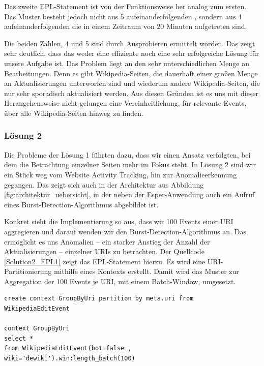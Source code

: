 Das zweite EPL-Statement ist von der Funktionsweise her analog zum ersten. Das Muster besteht jedoch nicht aus
5 aufeinanderfolgenden , sondern aus
4 aufeinanderfolgenden  die in einem Zeitraum von 20 Minuten aufgetreten sind.

Die beiden Zahlen, 4 und 5 sind durch Ausprobieren ermittelt worden. Das zeigt sehr deutlich, dass das weder eine
effiziente noch eine sehr erfolgreiche Lösung für unsere Aufgabe ist.
Das Problem liegt an den sehr unterschiedlichen Menge an Bearbeitungen.
Denn es gibt Wikipedia-Seiten, die dauerhaft einer großen Menge an Aktualisierungen unterworfen sind und wiederum andere Wikipedia-Seiten, die
nur sehr sporadisch aktualisiert werden. Aus diesen Gründen ist es uns mit dieser Herangehensweise
nicht gelungen eine Vereinheitlichung, für relevante Events, über alle Wikipedia-Seiten hinweg zu finden.

\subsubsection{Lösung 2}
Die Probleme der Lösung 1 führten dazu, dass wir einen Ansatz verfolgten, bei dem die Betrachtung einzelner Seiten mehr im Fokus steht.
In Lösung 2 sind wir ein Stück weg vom Website Activity Tracking, hin zur Anomalieerkennung gegangen. Das zeigt sich auch in der
Architektur aus Abbildung \ref{fig:architektur_uebersicht}, in der neben der Esper-Anwendung auch ein Aufruf eines
Burst-Detection-Algorithmus abgebildet ist.

Konkret sieht die Implementierung so aus, dass wir 100 Events einer URI aggregieren und darauf wenden wir den Burst-Detection-Algorithmus an.
Das ermöglicht es uns Anomalien -- ein starker Anstieg der Anzahl der Aktualisierungen -- einzelner URIs zu betrachten.
Der Quellcode \ref{Solution2_EPL1} zeigt das EPL-Statement hierzu. Es wird eine URI-Partitionierung mithilfe eines
Kontexts erstellt. Damit wird das Muster zur Aggregation der 100 Events je URI, mit einem Batch-Window, umgesetzt.

\begin{lstlisting}[label=Solution2_EPL1,caption=Lösung 2: EPL-Statement 2,language=epl,firstnumber=1,captionpos=b]
create context GroupByUri partition by meta.uri from WikipediaEditEvent

context GroupByUri
select *
from WikipediaEditEvent(bot=false , wiki='dewiki').win:length_batch(100)
\end{lstlisting}

